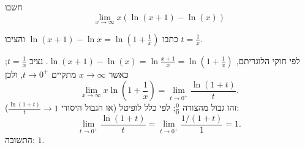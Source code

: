
\begin{question}
חשבו
\[ \lim_{x\to\infty} x\left(\ln(x+1)-\ln(x)\right) \]
\end{question}

\begin{hint}
כתבו $\ln(x+1)-\ln x=\ln\left(1+\frac1x\right)$ והציבו $t=\frac1x$.
\end{hint}

\begin{solution}
לפי חוקי הלוגריתם, $\ln(x+1)-\ln(x)=\ln\frac{x+1}{x}=\ln\left(1+\frac1x\right)$. נציב $t=\frac1x$; כאשר $x\to\infty$ מתקיים $t\to0^+$, ולכן
\[ \lim_{x\to\infty} x\ln\left(1+\frac1x\right)=\lim_{t\to0^+}\frac{\ln(1+t)}{t}. \]
זהו גבול מהצורה $\frac00$; לפי כלל לופיטל (או הגבול היסודי $\frac{\ln(1+t)}{t}\to1$):
\[ \lim_{t\to0^+}\frac{\ln(1+t)}{t}=\lim_{t\to0^+}\frac{1/(1+t)}{1}=1. \]
התשובה: $\boxed{1}$.
\end{solution}
